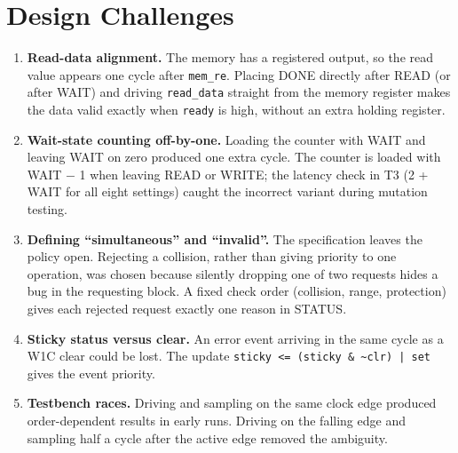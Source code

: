 \documentclass[11pt,a4paper]{article}
\newcommand{\sig}[1]{\texttt{#1}}
\begin{document}
\section{Design Challenges}
\begin{enumerate}[leftmargin=*,itemsep=3pt]
\item \textbf{Read-data alignment.} The memory has a registered output, so the read value appears one cycle after \sig{mem\_re}. Placing DONE directly after READ (or after WAIT) and driving \sig{read\_data} straight from the memory register makes the data valid exactly when \sig{ready} is high, without an extra holding register.
\item \textbf{Wait-state counting off-by-one.} Loading the counter with WAIT and leaving WAIT on zero produced one extra cycle. The counter is loaded with WAIT $-$ 1 when leaving READ or WRITE; the latency check in T3 (2 + WAIT for all eight settings) caught the incorrect variant during mutation testing.
\item \textbf{Defining ``simultaneous'' and ``invalid''.} The specification leaves the policy open. Rejecting a collision, rather than giving priority to one operation, was chosen because silently dropping one of two requests hides a bug in the requesting block. A fixed check order (collision, range, protection) gives each rejected request exactly one reason in STATUS.
\item \textbf{Sticky status versus clear.} An error event arriving in the same cycle as a W1C clear could be lost. The update \sig{sticky <= (sticky \& \textasciitilde clr) | set} gives the event priority.
\item \textbf{Testbench races.} Driving and sampling on the same clock edge produced order-dependent results in early runs. Driving on the falling edge and sampling half a cycle after the active edge removed the ambiguity.
\end{enumerate}

\end{document}
